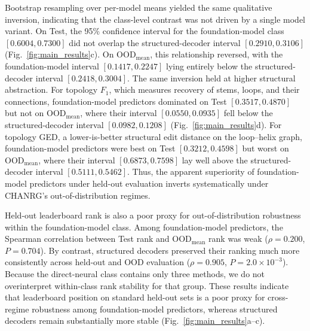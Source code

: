 \documentclass[pdflatex,sn-mathphys-num]{sn-jnl}%
\theoremstyle{thmstyleone}%
\theoremstyle{thmstyletwo}%
\theoremstyle{thmstylethree}%
\begin{document}
Bootstrap resampling over per-model means yielded the same qualitative inversion, indicating that the class-level contrast was not driven by a single model variant.
On Test, the 95\% confidence interval for the foundation-model class $[0.6004, 0.7300]$ did not overlap the structured-decoder interval $[0.2910, 0.3106]$ (Fig.~\ref{fig:main_results}c).
On $\mathrm{OOD}_{\mathrm{mean}}$, this relationship reversed, with the foundation-model interval $[0.1417, 0.2247]$ lying entirely below the structured-decoder interval $[0.2418, 0.3004]$.
The same inversion held at higher structural abstraction.
For topology $F_1$, which measures recovery of stems, loops, and their connections, foundation-model predictors dominated on Test $[0.3517, 0.4870]$ but not on $\mathrm{OOD}_{\mathrm{mean}}$, where their interval $[0.0550, 0.0935]$ fell below the structured-decoder interval $[0.0982, 0.1208]$ (Fig.~\ref{fig:main_results}d).
For topology GED, a lower-is-better structural edit distance on the loop--helix graph, foundation-model predictors were best on Test $[0.3212, 0.4598]$ but worst on $\mathrm{OOD}_{\mathrm{mean}}$, where their interval $[0.6873, 0.7598]$ lay well above the structured-decoder interval $[0.5111, 0.5462]$.
Thus, the apparent superiority of foundation-model predictors under held-out evaluation inverts systematically under CHANRG's out-of-distribution regimes.

Held-out leaderboard rank is also a poor proxy for out-of-distribution robustness within the foundation-model class.
Among foundation-model predictors, the Spearman correlation between Test rank and $\mathrm{OOD}_{\mathrm{mean}}$ rank was weak ($\rho = 0.200$, $P = 0.704$).
By contrast, structured decoders preserved their ranking much more consistently across held-out and OOD evaluation ($\rho = 0.905$, $P = 2.0\times10^{-3}$).
Because the direct-neural class contains only three methods, we do not overinterpret within-class rank stability for that group.
These results indicate that leaderboard position on standard held-out sets is a poor proxy for cross-regime robustness among foundation-model predictors, whereas structured decoders remain substantially more stable (Fig.~\ref{fig:main_results}a--c).
\end{document}
